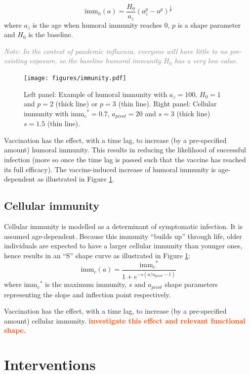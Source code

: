 \documentclass[11pt, onecolumn]{article}
\newcommand{\warning}[1]{\textbf{\textcolor{OrangeRed}{#1}}}
\newcommand{\note}[1]{\textit{\textcolor{Grey}{Note: #1}}}
\newcommand{\immh}{\ensuremath{\text{imm}_h}}
\newcommand{\immc}{\ensuremath{\text{imm}_c}}
\begin{document}
\begin{equation}
\immh (a) = \frac{H_0 }{a_z}(a_z^p - a^p) ^\frac{1}{p}
\end{equation}
where $a_z$ is the age when humoral immunity reaches 0, $p$ is a shape parameter  and $H_0$ is the baseline.

\note{In the context of pandemic influenza, everyone will have little to no pre-existing exposure, so the baseline humoral immunity $H_0$ has a very low value.}

\begin{figure}[!ht]
\centering
    \texttt{[image: figures/immunity.pdf]}
\caption{Left panel: Example of humoral immunity with $a_z=100$, $H_0=1$ and $p=2$ (thick line) or $p=3$ (thin line). Right panel: Cellular immunity with $\immc^* = 0.7$,  $a_{pivot}=20$ and $s=3$ (thick line) $s=1.5$ (thin line).}
\label{fig:immunity}
\end{figure}

Vaccination has the effect, with a time lag, to increase (by a pre-specified amount) humoral immunity. This results in reducing the likelihood of successful infection (more so once the time lag is passed such that the vaccine has reached its full efficacy). The vaccine-induced increase of humoral immunity is age-dependent as illustrated in Figure \ref{fig:immunity}. 

\subsection{Cellular immunity}	

Cellular immunity is modelled as a determinant of symptomatic infection. It is assumed age-dependent. Because this immunity ``builds up'' through life, older individuals are expected to have a larger cellular immunity than younger ones, hence results in an ``S'' shape curve as illustrated in Figure \ref{fig:immunity}:
\begin{equation}
\immc(a) = \frac{\immc^*}{1+e^{-s(a/a_{pivot} -1)}}
\end{equation}
where $\immc^*$ is the maximum immunity, $s$ and $a_{pivot}$ shape parameters representing the slope and inflection point respectively.

Vaccination has the effect, with a time lag, to increase (by a pre-specified amount) cellular immunity. \warning{investigate this effect and relevant functional shape.}

\section{Interventions}
\end{document}
